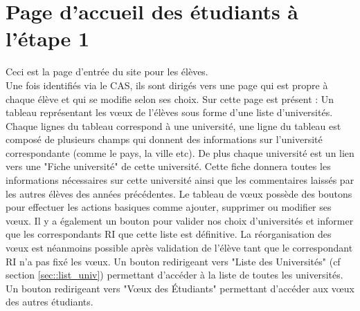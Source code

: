 \section{Page d'accueil des étudiants à l'étape 1}

Ceci est la page d'entrée du site pour les élèves.\\
Une fois identifiés via le CAS, ils sont dirigés vers une page qui est propre à chaque élève et qui se modifie selon ses choix.
Sur cette page est présent :
\bigbreak
Un tableau représentant les vœux de l'élèves sous forme d'une liste d'universités.
Chaque lignes du tableau correspond à une université, une ligne du tableau est composé de plusieurs champs qui donnent des informations sur l'université correspondante (comme le pays, la ville etc).
De plus chaque université est un lien vers une "Fiche université" de cette université. Cette fiche donnera toutes les informations nécessaires sur cette université ainsi que les commentaires laissés par les autres élèves des années précédentes.
Le tableau de vœux possède des boutons pour effectuer les actions basiques comme ajouter, supprimer ou modifier ses vœux. Il y a également un bouton pour valider nos choix d'universités et informer que les correspondants RI que cette liste est définitive. La réorganisation des vœux est néanmoins possible après validation de l'élève tant que le correspondant RI n'a pas fixé les vœux.
\bigbreak
Un bouton redirigeant vers "Liste des Universités" (cf section \ref{sec::list_univ}) permettant d'accéder à la liste de toutes les universités.
\bigbreak
Un bouton redirigeant vers "Vœux des Étudiants" permettant d'accéder aux vœux des autres étudiants.
